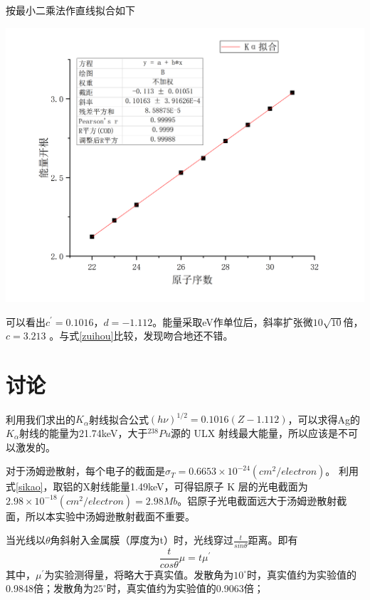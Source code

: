 \documentclass[hyperref]{ctexart}
\begin{document}
	按最小二乘法作直线拟合如下
	\begin{center}\includegraphics[scale=0.3]{t31}\end{center}

	可以看出$c^{\prime} = 0.1016$，$d=-1.112$。能量采取eV作单位后，斜率扩张微$10\sqrt{10}$倍， $c=3.213$ 。与式\eqref{zuihou}比较，发现吻合地还不错。



	\section{讨论}
	利用我们求出的$K_{\alpha}$射线拟合公式$(h \nu)^{1/2}=0.1016(Z-1.112)$，可以求得Ag的$K_{\alpha}$射线的能量为21.74keV，大于$^{238}Pu$源的 ULX 射线最大能量，所以应该是不可以激发的。

	对于汤姆逊散射，每个电子的截面是$\sigma_T = 0.6653 \times 10^{-24}(cm^2/electron)$。
	利用式\eqref{sikao}，取铝的X射线能量1.49keV，可得铝原子 K 层的光电截面为 $ 2.98 \times 10^{-18}(cm^2/electron)=2.98 Mb$。铝原子光电截面远大于汤姆逊散射截面，所以本实验中汤姆逊散射截面不重要。

	当光线以$\theta$角斜射入金属膜（厚度为t）时，光线穿过$\frac{t}{sin\theta}$距离。即有
	$$ \frac{t}{cos\theta} \mu = t \mu^{\prime} $$
	其中，$\mu^{\prime}$为实验测得量，将略大于真实值。发散角为$10^{\circ}$时，真实值约为实验值的0.9848倍；发散角为$25^{\circ}$时，真实值约为实验值的0.9063倍；


\end{document}
